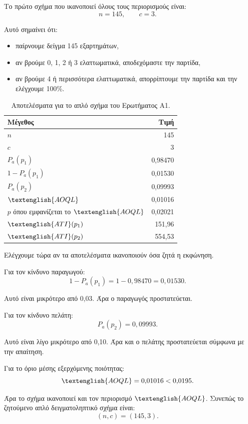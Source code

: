 \documentclass[12pt,a4paper]{article}
\newcommand{\Pa}{P_{\!a}}
\newcommand{\AOQL}{\textenglish{AOQL}}
\newcommand{\ATI}{\textenglish{ATI}}
\begin{document}
Το πρώτο σχήμα που ικανοποιεί όλους τους περιορισμούς είναι:
\[
    \boxed{n=145,\qquad c=3}.
\]

Αυτό σημαίνει ότι:

\begin{itemize}
    \item παίρνουμε δείγμα 145 εξαρτημάτων,
    \item αν βρούμε 0, 1, 2 ή 3 ελαττωματικά, αποδεχόμαστε την παρτίδα,
    \item αν βρούμε 4 ή περισσότερα ελαττωματικά, απορρίπτουμε την παρτίδα και
    την ελέγχουμε 100\%.
\end{itemize}

\begin{table}[H]
\centering
\caption{Αποτελέσματα για το απλό σχήμα του Ερωτήματος Α1.}
\begin{tabular}{lr}
\toprule
\textbf{Μέγεθος} & \textbf{Τιμή} \\
\midrule
\(n\) & 145 \\
\(c\) & 3 \\
\(\Pa(p_1)\) & 0,98470 \\
\(1-\Pa(p_1)\) & 0,01530 \\
\(\Pa(p_2)\) & 0,09993 \\
\(\AOQL\) & 0,01016 \\
\(p\) όπου εμφανίζεται το \(\AOQL\) & 0,02021 \\
\(\ATI(p_1)\) & 151,96 \\
\(\ATI(p_2)\) & 554,53 \\
\bottomrule
\end{tabular}
\end{table}

Ελέγχουμε τώρα αν τα αποτελέσματα ικανοποιούν όσα ζητά η εκφώνηση.

Για τον κίνδυνο παραγωγού:
\[
    1-\Pa(p_1)=1-0{,}98470=0{,}01530.
\]

Αυτό είναι μικρότερο από 0,03. Άρα ο παραγωγός προστατεύεται.

Για τον κίνδυνο πελάτη:
\[
    \Pa(p_2)=0{,}09993.
\]

Αυτό είναι λίγο μικρότερο από 0,10. Άρα και ο πελάτης προστατεύεται σύμφωνα με
την απαίτηση.

Για το όριο μέσης εξερχόμενης ποιότητας:
\[
    \AOQL=0{,}01016<0{,}0195.
\]

Άρα το σχήμα ικανοποιεί και τον περιορισμό \(\AOQL\). Συνεπώς το ζητούμενο
απλό δειγματοληπτικό σχήμα είναι:
\[
    \boxed{(n,c)=(145,3)}.
\]

\end{document}
